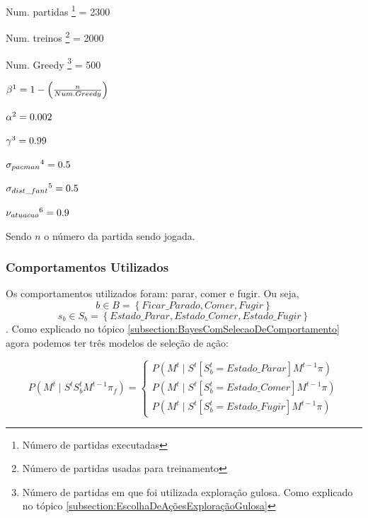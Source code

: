 \begin{multicols}{2}

Num. partidas%
\footnote{Número de partidas executadas%
} = 2300

Num. treinos%
\footnote{Número de partidas usadas para treinamento%
} = 2000

Num. Greedy%
\footnote{Número de partidas em que foi utilizada exploração gulosa. Como explicado no tópico \ref{subsection:EscolhaDeAçõesExploraçãoGulosa}%
} = 500

$ \beta%
\footnote{Fator de exploração gulosa utilizado.%
} = 1 - \left( \frac{n}{Num. Greedy} \right) $

$ \alpha%
\footnote{Fator de Aprendizagem%
} = 0.002 $

$ \gamma%
\footnote{Fator de Desconto%
} = 0.99 $

$ \sigma_{pacman}%
\footnote{Desvio padrão do erro gaussiano da posição recebida do Pacman%
} = 0.5 $

$ \sigma_{dist\_fant}%
\footnote{Desvio padrão do erro gaussiano da distância recebida para os Fantasmas%
} = 0.5 $

$ \nu_{atuacao}%
\footnote{Fator de Acerto na movimentação do Pacman. Descrito no algorítmo \ref{algorithm:ErroAtuacao} na seção \ref{section:AmbienteDeTestes}%
} = 0.9 $

\end{multicols}

Sendo $ n $ o número da partida sendo jogada.

\subsubsection{Comportamentos Utilizados}

Os comportamentos utilizados foram: parar, comer e fugir. Ou seja, $$ b \in B = \left\{ Ficar\_Parado, Comer, Fugir \right\} $$ $$ s_b \in S_b = \left\{ Estado\_Parar, Estado\_Comer, Estado\_Fugir \right\} $$. Como explicado no tópico \ref{subsection:BayesComSelecaoDeComportamento} agora podemos ter três modelos de seleção de ação: 

\begin{equation}
    P \left( M^t \mid S^t S_b^t M^{t-1} \pi_f \right) = 
        \left\{
            \begin{array}{l}
                P \left( M^t \mid S^t \left[ S_b^t=Estado\_Parar \right] M^{t-1} \pi \right) \\
                P \left( M^t \mid S^t \left[ S_b^t=Estado\_Comer \right] M^{t-1} \pi \right) \\
                P \left( M^t \mid S^t \left[ S_b^t=Estado\_Fugir \right] M^{t-1} \pi \right)
            \end{array}
        \right.
\end{equation}

